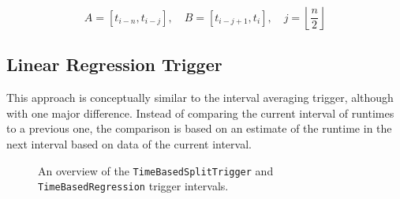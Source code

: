 \begin{equation}
	A = \left[t_{i-n}, t_{i-j}\right],\quad B=\left[t_{i-j+1},t_i\right],\quad j=\left\lfloor\frac{n}{2}\right\rfloor\label{eq:split_intervals}
\end{equation}

\subsection{Linear Regression Trigger}
This approach is conceptually similar to the interval averaging trigger, although with one major difference. Instead of comparing the current interval of runtimes to a previous one, the comparison is based on an estimate of the runtime in the next interval based on data of the current interval. 

 \begin{figure}[htpb]
 	\centering
 	\begin{tikzpicture}
% 		
% 		 
% 		 
% 		
% 		
% 		
% 		
 	\end{tikzpicture}
 	\caption{An overview of the \texttt{TimeBasedSplitTrigger} and \texttt{TimeBasedRegression} trigger intervals. }
 \end{figure}
 
